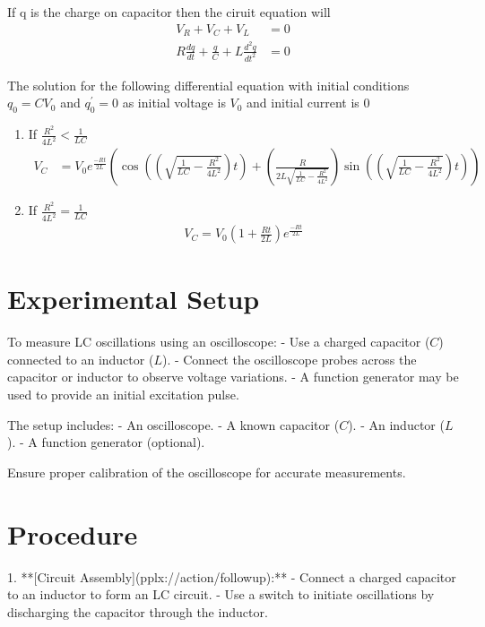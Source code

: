 \documentclass[a4paper,12pt]{article}
\begin{document}
If q is the charge on capacitor then the ciruit equation will  
\begin{align*}
  V_R + V_C + V_L &= 0\\
  R\frac{dq}{dt} + \frac{q}{C} + L\frac{d^2q}{dt^2} &= 0
\end{align*}

The solution for the following differential equation with initial conditions $q_0 = CV_0$ and $q^{\prime}_0 = 0$ as initial voltage is $V_0$ and initial current is 0
\begin{enumerate}
  \item If $\frac{R^2}{4L^2} < \frac{1}{LC}$
    \begin{align*}
      V_C &= V_0e^{\frac{-Rt}{2L}}(\cos((\sqrt{\frac{1}{LC} - \frac{R^2}{4L^2}})t)+(\frac{R}{2L\sqrt{\frac{1}{LC} - \frac{R^2}{4L^2}}})\sin((\sqrt{\frac{1}{LC} - \frac{R^2}{4L^2}})t))
    \end{align*}

  \item If $\frac{R^2}{4L^2} = \frac{1}{LC}$
    \begin{align*}
      V_C = V_0(1+\frac{Rt}{2L})e^{\frac{-Rt}{2L}}
    \end{align*}

\end{enumerate}
\section{Experimental Setup}

To measure LC oscillations using an oscilloscope:
- Use a charged capacitor (\(C\)) connected to an inductor (\(L\)).
- Connect the oscilloscope probes across the capacitor or inductor to observe voltage variations.
- A function generator may be used to provide an initial excitation pulse.

The setup includes:
- An oscilloscope.
- A known capacitor (\(C\)).
- An inductor (\(L\)).
- A function generator (optional).

Ensure proper calibration of the oscilloscope for accurate measurements.

\section{Procedure}

1. **[Circuit Assembly](pplx://action/followup):**
   - Connect a charged capacitor to an inductor to form an LC circuit.
   - Use a switch to initiate oscillations by discharging the capacitor through the inductor.
\end{document}
